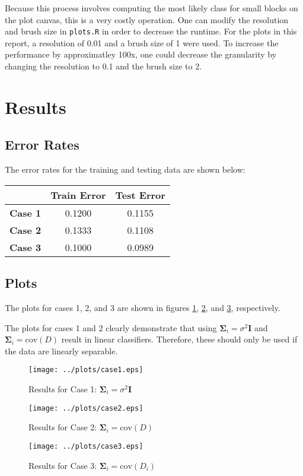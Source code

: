 \documentclass{article}
\begin{document}
Because this process involves computing the most likely class for small
blocks on the plot canvas, this is a very costly operation. One can modify
the resolution and brush size in \verb|plots.R| in order to decrease the
runtime. For the plots in this report, a resolution of 0.01 and a brush 
size of 1 were used. To increase the performance by approximatley 100x,
one could decrease the granularity by changing the resolution to 0.1 and 
the brush size to 2.

\section{Results}

\subsection{Error Rates}

The error rates for the training and testing data are shown below:
\begin{center}
\begin{tabular}{|c|c|c|}
\hline
	& {\bf Train Error } & {\bf Test Error } \\
\hline
\hline
	{\bf Case 1} & 0.1200 & 0.1155 \\
\hline
	{\bf Case 2} & 0.1333 & 0.1108 \\
\hline
	{\bf Case 3} & 0.1000 & 0.0989 \\
\hline
\end{tabular}
\end{center}

\subsection{Plots}

The plots for cases 1, 2, and 3 are shown in figures \ref{fig:case1-scatter},
\ref{fig:case2-scatter}, and \ref{fig:case3-scatter}, respectively.

The plots for cases 1 and 2 clearly demonstrate that using $\mathbf{\Sigma}_i=\sigma^2\mathbf{I}$
and $\mathbf{\Sigma}_i=\mbox{cov}(D)$ result in linear classifiers. Therefore, these should only
be used if the data are linearly separable.

\begin{figure}[thb]
\centering
\label{fig:case1-scatter}
\texttt{[image: ../plots/case1.eps]}
\caption{Results for Case 1: $\mathbf{\Sigma}_i = \sigma^2 \mathbf{I}$}
\end{figure}

\begin{figure}[thb]
\centering
\label{fig:case2-scatter}
\texttt{[image: ../plots/case2.eps]}
\caption{Results for Case 2: $\mathbf{\Sigma}_i = \mbox{cov}(D)$}
\end{figure}

\begin{figure}[thb]
\centering
\label{fig:case3-scatter}
\texttt{[image: ../plots/case3.eps]}
\caption{Results for Case 3: $\mathbf{\Sigma}_i = \mbox{cov}(D_i)$}
\end{figure}
\end{document}

